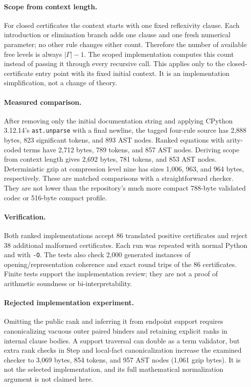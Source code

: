 \paragraph{Scope from context length.}
For closed certificates the context starts with one fixed reflexivity
clause. Each introduction or elimination branch adds one clause and one
fresh numerical parameter; no other rule changes either count.
Therefore the number of available free levels is always
$\lvert\Gamma\rvert-1$. The scoped implementation computes this count
instead of passing it through every recursive call. This applies only to
the closed-certificate entry point with its fixed initial context.
It is an implementation simplification, not a change of theory.

\paragraph{Measured comparison.}
After removing only the initial documentation string and applying
CPython 3.12.14's \texttt{ast.unparse} with a final newline, the tagged
four-rule source has 2,888 bytes, 823 significant tokens, and 893 AST nodes.
Ranked equations with arity-coded terms have 2,712 bytes, 789 tokens,
and 857 AST nodes. Deriving scope from context length gives 2,692 bytes,
781 tokens, and 853 AST nodes. Deterministic gzip at compression level
nine has sizes 1,006, 963, and 964 bytes, respectively.
These are matched comparisons with a straightforward checker. They are
not lower than the repository's much more compact 788-byte validated
codec or 516-byte compact profile.

\paragraph{Verification.}
Both ranked implementations accept 86 translated positive certificates
and reject 38 additional malformed certificates. Each run was repeated
with normal Python and with \texttt{-O}. The tests also check 2,000
generated instances of opening/representation coherence and exact
round trips of the 86 certificates. Finite tests support the implementation
review; they are not a proof of arithmetic soundness or bi-interpretability.

\paragraph{Rejected implementation experiment.}
Omitting the public rank and inferring it from endpoint support requires
canonicalizing vacuous outer paired binders and retaining explicit ranks
in internal clause bodies. A support traversal can double as a term
validator, but extra rank checks in Step and local-fact canonicalization
increase the examined checker to 3,069 bytes, 854 tokens, and 957 AST
nodes (1,061 gzip bytes). It is not the selected implementation, and its
full mathematical normalization argument is not claimed here.
